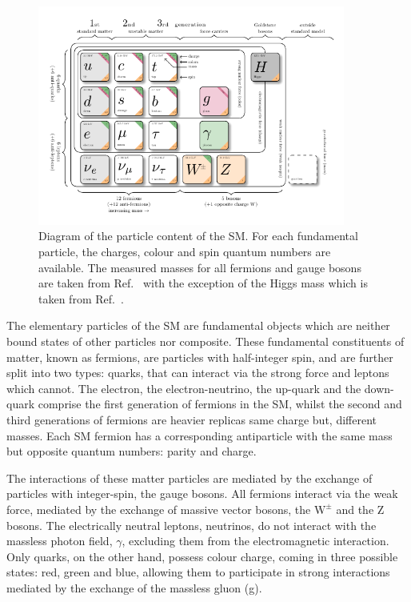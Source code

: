 \begin{figure}[h]
\centering
\includegraphics[width= 0.9\textwidth]{Figures/Introduction/Particles.pdf}
\caption{Diagram of the particle content of the SM. For each fundamental particle, the charges, colour and spin quantum numbers are available. The measured masses for all fermions and gauge bosons are taken from Ref.~\cite{ParticleMasses} with the exception of the Higgs mass which is taken from Ref.~\cite{Higgs_Mass}.}
\label{Figure:Introduction_1}
\end{figure}

The elementary particles of the SM are fundamental objects which are neither bound states of other particles nor composite. These fundamental constituents of matter, known as fermions, are particles with half-integer spin, and are further split into two types: quarks, that can interact via the strong force and leptons which cannot.  The electron, the electron-neutrino, the up-quark and the down-quark comprise the first generation of fermions in the SM, whilst the second and third generations of fermions are heavier replicas \ie same charge but, different masses. Each SM fermion has a corresponding antiparticle with the same mass but opposite quantum numbers: parity and charge.

The interactions of these matter particles are mediated by the exchange of particles with integer-spin, the gauge bosons. All fermions interact via the weak force, mediated by the exchange of massive vector bosons, the $\text{W}^\pm$ and the Z bosons. The electrically neutral leptons, neutrinos, do not interact with the massless photon field, $\gamma$, excluding them from the electromagnetic interaction. Only quarks, on the other hand, possess colour charge, coming in three possible states: red, green and blue, allowing them to participate in strong interactions mediated by the exchange of the massless gluon (g). 


